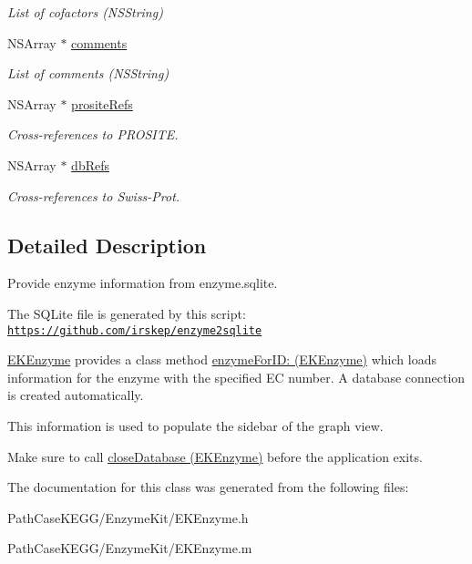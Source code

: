 \begin{DoxyCompactItemize}
\begin{DoxyCompactList}\small\item\em List of cofactors (NSString) \end{DoxyCompactList}\item 
\hypertarget{interface_e_k_enzyme_af16f423bcbc3bf74e67d6d5b8061aa50}{
NSArray $\ast$ \hyperlink{interface_e_k_enzyme_af16f423bcbc3bf74e67d6d5b8061aa50}{comments}}
\label{interface_e_k_enzyme_af16f423bcbc3bf74e67d6d5b8061aa50}

\begin{DoxyCompactList}\small\item\em List of comments (NSString) \end{DoxyCompactList}\item 
\hypertarget{interface_e_k_enzyme_ac940a1918b5a133c7ce8914ad2d98530}{
NSArray $\ast$ \hyperlink{interface_e_k_enzyme_ac940a1918b5a133c7ce8914ad2d98530}{prositeRefs}}
\label{interface_e_k_enzyme_ac940a1918b5a133c7ce8914ad2d98530}

\begin{DoxyCompactList}\small\item\em Cross-\/references to PROSITE. \end{DoxyCompactList}\item 
\hypertarget{interface_e_k_enzyme_a0ad4c3edcd63bc790612ca763f4bb195}{
NSArray $\ast$ \hyperlink{interface_e_k_enzyme_a0ad4c3edcd63bc790612ca763f4bb195}{dbRefs}}
\label{interface_e_k_enzyme_a0ad4c3edcd63bc790612ca763f4bb195}

\begin{DoxyCompactList}\small\item\em Cross-\/references to Swiss-\/Prot. \end{DoxyCompactList}\end{DoxyCompactItemize}


\subsection{Detailed Description}
Provide enzyme information from enzyme.sqlite. 

The SQLite file is generated by this script: \href{https://github.com/irskep/enzyme2sqlite}{\tt https://github.com/irskep/enzyme2sqlite}

\hyperlink{interface_e_k_enzyme}{EKEnzyme} provides a class method \hyperlink{interface_e_k_enzyme_aea5a6e850903603ca3f2322823f28597}{enzymeForID: (EKEnzyme)} which loads information for the enzyme with the specified EC number. A database connection is created automatically.

This information is used to populate the sidebar of the graph view.

Make sure to call \hyperlink{interface_e_k_enzyme_ae4173a1d9f6cbc41a068e415475010be}{closeDatabase (EKEnzyme)} before the application exits. 

The documentation for this class was generated from the following files:\begin{DoxyCompactItemize}
\item 
PathCaseKEGG/EnzymeKit/EKEnzyme.h\item 
PathCaseKEGG/EnzymeKit/EKEnzyme.m\end{DoxyCompactItemize}
